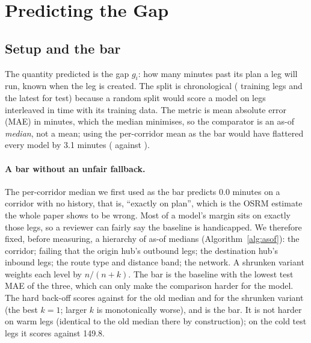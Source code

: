 \section{Predicting the Gap}\label{sec:prediction}

\subsection{Setup and the bar}
The quantity predicted is the gap $g_i$: how many minutes past its plan a leg will run, known when the leg is created. The split is chronological (\fzSplitTrain{} training legs and the latest \fzSplitTest{} for test) because a random split would score a model on legs interleaved in time with its training data. The metric is mean absolute error (MAE) in minutes, which the median minimises, so the comparator is an as-of \emph{median}, not a mean; using the per-corridor mean as the bar would have flattered every model by 3.1 minutes (\fzMaeCorridorMean{} against \fzBarOldMedianMaeDpTwo{}).

\paragraph{A bar without an unfair fallback.} The per-corridor median we first used as the bar predicts 0.0 minutes on a corridor with no history, that is, ``exactly on plan'', which is the OSRM estimate the whole paper shows to be wrong. Most of a model's margin sits on exactly those legs, so a reviewer can fairly say the baseline is handicapped. We therefore fixed, before measuring, a hierarchy of as-of medians (Algorithm~\ref{alg:asof}): the corridor; failing that the origin hub's outbound legs; the destination hub's inbound legs; the route type and distance band; the network. A shrunken variant weights each level by $n/(n+k)$. The bar is the baseline with the lowest test MAE of the three, which can only make the comparison harder for the model. The hard back-off scores \fzBarBackoffMaeDpTwo{} against \fzBarOldMedianMaeDpTwo{} for the old median and \fzBarShrunkMaeDpTwo{} for the shrunken variant (the best $k=1$; larger $k$ is monotonically worse), and is the bar. It is not harder on warm legs (identical to the old median there by construction); on the \fzColdLegsTest{} cold test legs it scores \fzColdMaeBackoffDpOne{} against 149.8.

